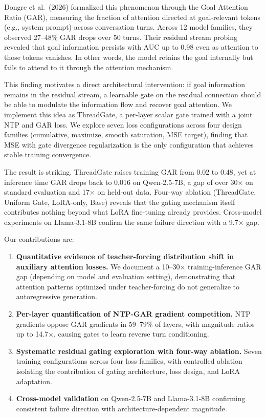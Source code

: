 \documentclass[11pt,a4paper]{article}
\begin{document}
Dongre et al.\ (2026) formalized this phenomenon through the Goal Attention Ratio (GAR), measuring the fraction of attention directed at goal-relevant tokens (e.g., system prompt) across conversation turns.
Across 12 model families, they observed 27--48\% GAR drops over 50 turns.
Their residual stream probing revealed that goal information persists with AUC up to 0.98 even as attention to those tokens vanishes.
In other words, the model retains the goal internally but fails to attend to it through the attention mechanism.

This finding motivates a direct architectural intervention: if goal information remains in the residual stream, a learnable gate on the residual connection should be able to modulate the information flow and recover goal attention.
We implement this idea as ThreadGate, a per-layer scalar gate trained with a joint NTP and GAR loss.
We explore seven loss configurations across four design families (cumulative, maximize, smooth saturation, MSE target), finding that MSE with gate divergence regularization is the only configuration that achieves stable training convergence.

The result is striking. ThreadGate raises training GAR from 0.02 to 0.48, yet at inference time GAR drops back to 0.016 on Qwen-2.5-7B, a gap of over 30$\times$ on standard evaluation and 17$\times$ on held-out data.
Four-way ablation (ThreadGate, Uniform Gate, LoRA-only, Base) reveals that the gating mechanism itself contributes nothing beyond what LoRA fine-tuning already provides.
Cross-model experiments on Llama-3.1-8B confirm the same failure direction with a 9.7$\times$ gap.

Our contributions are:
\begin{enumerate}[nosep]
    \item \textbf{Quantitative evidence of teacher-forcing distribution shift in auxiliary attention losses.} We document a 10--30$\times$ training-inference GAR gap (depending on model and evaluation setting), demonstrating that attention patterns optimized under teacher-forcing do not generalize to autoregressive generation.
    \item \textbf{Per-layer quantification of NTP-GAR gradient competition.} NTP gradients oppose GAR gradients in 59--79\% of layers, with magnitude ratios up to 14.7$\times$, causing gates to learn reverse turn conditioning.
    \item \textbf{Systematic residual gating exploration with four-way ablation.} Seven training configurations across four loss families, with controlled ablation isolating the contribution of gating architecture, loss design, and LoRA adaptation.
    \item \textbf{Cross-model validation} on Qwen-2.5-7B and Llama-3.1-8B confirming consistent failure direction with architecture-dependent magnitude.
\end{enumerate}
\end{document}
